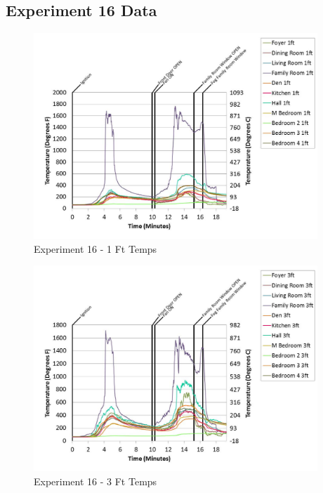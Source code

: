 \documentclass{article}
\begin{document}
\begin{appendices}
	\clearpage

		\clearpage
\clearpage		\large
\subsection{Experiment 16 Data} \label{App:Exp16Results} 

	\begin{figure}[h!]
		\centering
		\includegraphics[height=3.05in]{0_Images/Results_Charts/Exp_16_Charts/1FtTemps.pdf}
		\caption{Experiment 16 - 1 Ft Temps}
	\end{figure}
 

	\begin{figure}[h!]
		\centering
		\includegraphics[height=3.05in]{0_Images/Results_Charts/Exp_16_Charts/3FtTemps.pdf}
		\caption{Experiment 16 - 3 Ft Temps}
	\end{figure}
 
	\clearpage


\end{appendices}
\end{document}
